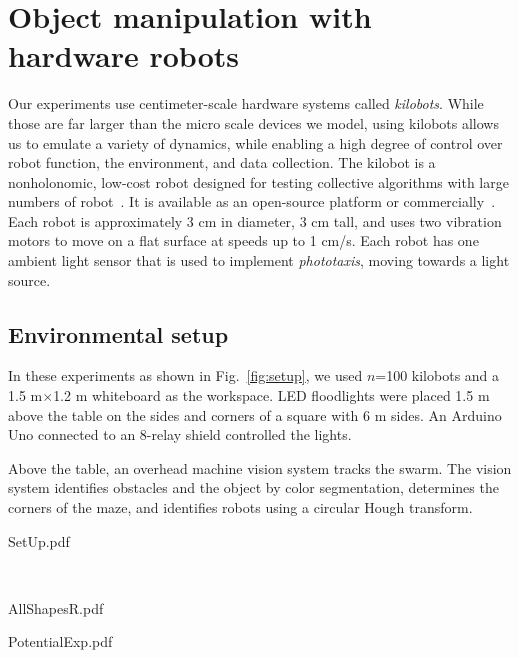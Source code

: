 
\section{Object manipulation with hardware robots}\label{sec:realExperiment}
Our experiments use centimeter-scale hardware systems called \emph{kilobots}.  While those are far larger than the micro scale devices we model, using kilobots allows us to emulate a variety of dynamics, while enabling a high degree of control over robot function, the environment, and data collection. The kilobot is a nonholonomic, low-cost robot designed for testing collective algorithms with large numbers of robot~\cite{Rubenstein2012,rubenstein2014programmable}. It is available as an open-source platform or commercially~\cite{K-Team2015}.  Each robot is approximately 3 cm in diameter, 3 cm tall, and uses two vibration motors to move on a flat surface at speeds up to 1 cm/s.  Each robot has one ambient light sensor that is used to implement \emph{phototaxis},  moving towards a light source. 

  
\subsection{Environmental setup}  
In these experiments as shown in Fig.~\ref{fig:setup}, we used $n$=100 kilobots and a 1.5 m$\times$1.2 m whiteboard as the workspace. 
LED floodlights were placed 1.5 m above the table on the sides and corners of a square with 6 m sides. An Arduino Uno connected to an 8-relay shield controlled the lights.  

Above the table, an overhead machine vision system tracks the swarm. The vision system identifies obstacles and the object by color segmentation, determines the corners of the maze, and identifies robots using a circular Hough transform. 

\begin{figure*}
\begin{center}
	\begin{overpic}[width=0.7\columnwidth]{SetUp.pdf}%
	\end{overpic}\\
	\vspace{3em}
	\begin{overpic}[width=0.33\columnwidth]{AllShapesR.pdf}%
	\end{overpic}
	\begin{overpic}[width=0.6\columnwidth]{PotentialExp.pdf}%
	\end{overpic}
\end{center}
\caption{\label{fig:setup}
Hardware platform. At right are the shapes used for hardware experiments and a visualization of the potential field. }
\end{figure*}


